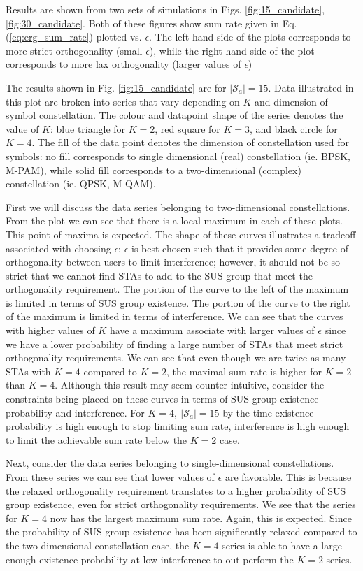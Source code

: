 
Results are shown from two sets of simulations in Figs. \ref{fig:15_candidate},\ref{fig:30_candidate}. Both of these figures show sum rate given in Eq. (\ref{eq:erg_sum_rate}) plotted vs. $\epsilon$. The left-hand side of the plots corresponds to more strict orthogonality (small $\epsilon$), while the right-hand side of the plot corresponds to more lax orthogonality (larger values of $\epsilon$)

The results shown in Fig. \ref{fig:15_candidate} are for $\vert \mathcal{S}_a \vert = 15$. Data illustrated in this plot are broken into series that vary depending on $K$ and dimension of symbol constellation. The colour and datapoint shape of the series denotes the value of $K$: blue triangle for $K=2$, red square for $K=3$, and black circle for $K=4$. The fill of the data point denotes the dimension of constellation used for symbols: no fill corresponds to single dimensional (real) constellation (ie. BPSK, M-PAM), while solid fill corresponds to a two-dimensional (complex) constellation (ie. QPSK, M-QAM).

First we will discuss the data series belonging to two-dimensional constellations. From the plot we can see that there is a local maximum in each of these plots. This point of maxima is expected. The shape of these curves illustrates a tradeoff associated with choosing $\epsilon$: $\epsilon$ is best chosen such that it provides some degree of orthogonality between users to limit interference; however, it should not be so strict that we cannot find STAs to add to the SUS group that meet the orthogonality requirement. The portion of the curve to the left of the maximum is limited in terms of SUS group existence. The portion of the curve to the right of the maximum is limited in terms of interference. We can see that the curves with higher values of $K$ have a maximum associate with larger values of $\epsilon$ since we have a lower probability of finding a large number of STAs that meet strict orthogonality requirements. We can see that even though we are twice as many STAs with $K=4$ compared to $K=2$, the maximal sum rate is higher for $K=2$ than $K=4$. Although this result may seem counter-intuitive, consider the constraints being placed on these curves in terms of SUS group existence probability and interference. For $K=4,\ \vert \mathcal{S}_a \vert = 15$ by the time existence probability is high enough to stop limiting sum rate, interference is high enough to limit the achievable sum rate below the $K=2$ case.

Next, consider the data series belonging to single-dimensional constellations. From these series we can see that lower values of $\epsilon$ are favorable. This is because the relaxed orthogonality requirement translates to a higher probability of SUS group existence, even for strict orthogonality requirements. We see  that the series for $K=4$ now has the largest maximum sum rate. Again, this is expected. Since the probability of SUS group existence has been significantly relaxed compared to the two-dimensional constellation case, the $K=4$ series is able to have a large enough existence probability at low interference to out-perform the $K=2$ series.

